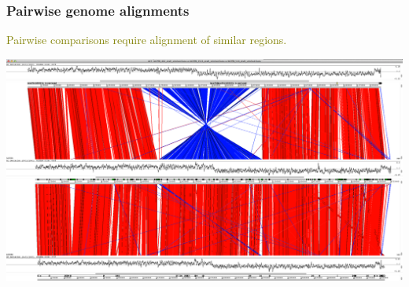 \begin{frame}
\begin{columns}[T]
\begin{column}{5cm}
    \end{column}
  \end{columns}       
\end{frame}

%
\begin{frame}
  \frametitle{Pairwise genome alignments}
  \textcolor{olive}{Pairwise comparisons require alignment of similar regions.}
  \begin{center}
    \includegraphics[width=\textwidth]{images/pairwise_genome_alignment}
  \end{center}  
\end{frame}

